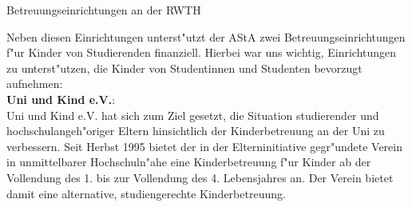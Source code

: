 \begin{artikel}{Betreuungseinrichtungen an der RWTH}
\begin{itemize}
\end{itemize}

Neben diesen Einrichtungen unterst"utzt der AStA zwei Betreuungseinrichtungen f"ur Kinder von Studierenden finanziell. Hierbei war uns wichtig, Einrichtungen zu unterst"utzen, die Kinder von Studentinnen und Studenten bevorzugt aufnehmen:\\

\textbf{Uni und Kind e.V.}:\\
Uni und Kind e.V. hat sich zum Ziel gesetzt, die Situation studierender und hochschulangeh"origer Eltern hinsichtlich der Kinderbetreuung an der Uni zu verbessern. Seit Herbst 1995 bietet der in der Elterninitiative gegr"undete Verein in unmittelbarer Hochschuln"ahe eine Kinderbetreuung f"ur Kinder ab der Vollendung des 1. bis zur Vollendung des 4. Lebensjahres an. Der Verein bietet damit eine alternative, studiengerechte Kinderbetreuung.\\

\end{artikel}

